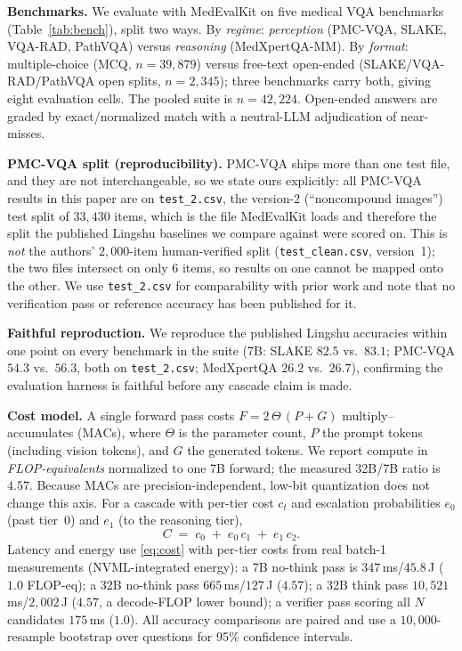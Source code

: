 \documentclass[conference]{IEEEtran}
\begin{document}
\textbf{Benchmarks.} We evaluate with MedEvalKit on five medical VQA benchmarks (Table~\ref{tab:bench}), split two ways. By \emph{regime}: \emph{perception} (PMC-VQA, SLAKE, VQA-RAD, PathVQA) versus \emph{reasoning} (MedXpertQA-MM). By \emph{format}: multiple-choice (MCQ, $n{=}39{,}879$) versus free-text open-ended (SLAKE/VQA-RAD/PathVQA open splits, $n{=}2{,}345$); three benchmarks carry both, giving eight evaluation cells. The pooled suite is $n{=}42{,}224$. Open-ended answers are graded by exact/normalized match with a neutral-LLM adjudication of near-misses.

\textbf{PMC-VQA split (reproducibility).} PMC-VQA ships more than one test file, and they are not interchangeable, so we state ours explicitly: all PMC-VQA results in this paper are on \texttt{test\_2.csv}, the version-2 (``noncompound images'') test split of $33{,}430$ items, which is the file MedEvalKit loads and therefore the split the published Lingshu baselines we compare against were scored on. This is \emph{not} the authors' $2{,}000$-item human-verified split (\texttt{test\_clean.csv}, version~1); the two files intersect on only $6$ items, so results on one cannot be mapped onto the other. We use \texttt{test\_2.csv} for comparability with prior work and note that no verification pass or reference accuracy has been published for it.

\textbf{Faithful reproduction.} We reproduce the published Lingshu accuracies within one point on every benchmark in the suite (7B: SLAKE $82.5$ vs.\ $83.1$; PMC-VQA $54.3$ vs.\ $56.3$, both on \texttt{test\_2.csv}; MedXpertQA $26.2$ vs.\ $26.7$), confirming the evaluation harness is faithful before any cascade claim is made.

\textbf{Cost model.} A single forward pass costs $F = 2\,\Theta\,(P+G)$ multiply--accumulates (MACs), where $\Theta$ is the parameter count, $P$ the prompt tokens (including vision tokens), and $G$ the generated tokens. We report compute in \emph{FLOP-equivalents} normalized to one 7B forward; the measured 32B/7B ratio is $4.57$. Because MACs are precision-independent, low-bit quantization does not change this axis. For a cascade with per-tier cost $c_t$ and escalation probabilities $e_0$ (past tier~0) and $e_1$ (to the reasoning tier),
\begin{equation}
C \;=\; c_{0} \;+\; e_{0}\,c_{1} \;+\; e_{1}\,c_{2}. \label{eq:cost}
\end{equation}
Latency and energy use \eqref{eq:cost} with per-tier costs from real batch-1 measurements (NVML-integrated energy): a 7B no-think pass is $347$\,ms/$45.8$\,J ($1.0$ FLOP-eq); a 32B no-think pass $665$\,ms/$127$\,J ($4.57$); a 32B think pass $10{,}521$\,ms/$2{,}002$\,J ($4.57$, a decode-FLOP lower bound); a verifier pass scoring all $N$ candidates $175$\,ms ($1.0$). All accuracy comparisons are paired and use a $10{,}000$-resample bootstrap over questions for 95\% confidence intervals.
\end{document}
